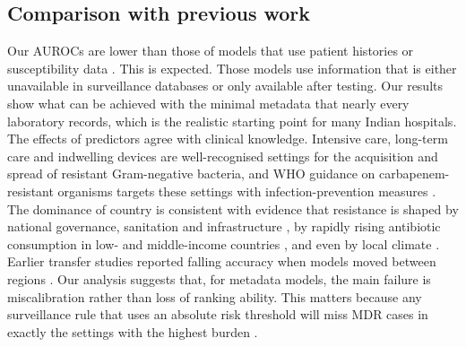 \documentclass[11pt,a4paper]{article}
\begin{document}
\subsection{Comparison with previous work}
Our AUROCs are lower than those of models that use patient histories \cite{yelin2019,lewinepstein2021} or susceptibility data \cite{valavarasu2025,wishal2026}. This is expected. Those models use information that is either unavailable in surveillance databases or only available after testing. Our results show what can be achieved with the minimal metadata that nearly every laboratory records, which is the realistic starting point for many Indian hospitals. The effects of predictors agree with clinical knowledge. Intensive care, long-term care and indwelling devices are well-recognised settings for the acquisition and spread of resistant Gram-negative bacteria, and WHO guidance on carbapenem-resistant organisms targets these settings with infection-prevention measures \cite{who2017cre}. The dominance of country is consistent with evidence that resistance is shaped by national governance, sanitation and infrastructure \cite{collignon2018}, by rapidly rising antibiotic consumption in low- and middle-income countries \cite{klein2018}, and even by local climate \cite{macfadden2018}. Earlier transfer studies reported falling accuracy when models moved between regions \cite{nsubuga2024}. Our analysis suggests that, for metadata models, the main failure is miscalibration rather than loss of ranking ability. This matters because any surveillance rule that uses an absolute risk threshold will miss MDR cases in exactly the settings with the highest burden \cite{vancalster2019}.
\end{document}
